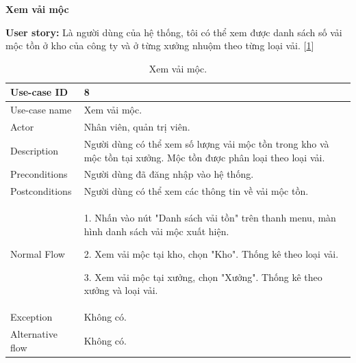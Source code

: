 \textbf{Xem vải mộc}\par
\textbf{User story:} Là người dùng của hệ thống, tôi có thể xem được danh sách số vải mộc tồn ở kho của công ty và ở từng xưởng nhuộm theo từng loại vải. [\ref{bang8}]
\begin{table}[!htp]
    \centering
    \begin{tabular}{|m{3cm}|m{10cm}|}
    \hline 
        Use-case ID & 8\\ \hline
        Use-case name & Xem vải mộc.\\ \hline
        Actor & Nhân viên, quản trị viên.\\ \hline
        Description & Người dùng có thể xem số lượng vải mộc tồn trong kho và mộc tồn tại xưởng. Mộc tồn được phân loại theo loại vải.\\ \hline
        Preconditions & Người dùng đã đăng nhập vào hệ thống.\\ \hline
        Postconditions & Người dùng có thể xem các thông tin về vải mộc tồn.\\ \hline
        Normal Flow & 
        1. Nhấn vào nút "Danh sách vải tồn" trên thanh menu, màn hình danh sách vải mộc xuất hiện.\par
        2. Xem vải mộc tại kho, chọn "Kho". Thống kê theo loại vải.\par
        3. Xem vải mộc tại xưởng, chọn "Xưởng". Thống kê theo xưởng và loại vải.
        \\ \hline
        Exception & Không có.\\ \hline
        Alternative flow & Không có.\\ 
    \hline 
    \end{tabular}
    \caption{Xem vải mộc.}
    \label{bang8}
\end{table}

